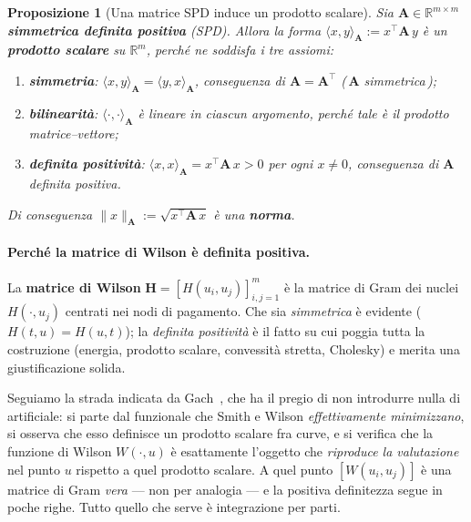 \documentclass[11pt,a4paper]{article}
\theoremstyle{plain}
\newtheorem{proposizione}[teorema]{Proposizione}
\theoremstyle{definition}
\theoremstyle{remark}
\newcommand{\Hmat}{\mathbf{H}}
\newcommand{\transp}{^{\!\top}}
\begin{document}
\begin{proposizione}[Una matrice SPD induce un prodotto scalare]
\label{oss:spd-prodotto}
Sia $\mathbf{A}\in\mathbb{R}^{m\times m}$ \textbf{simmetrica definita positiva} (SPD).
Allora la forma $\langle x,y\rangle_{\mathbf{A}} := x\transp \mathbf{A}\, y$ \`e un
\textbf{prodotto scalare} su $\mathbb{R}^m$, perch\'e ne soddisfa i tre assiomi:
\begin{enumerate}
  \item \textbf{simmetria}: $\langle x,y\rangle_{\mathbf{A}} = \langle y,x\rangle_{\mathbf{A}}$,
        conseguenza di $\mathbf{A} = \mathbf{A}\transp$ (\,$\mathbf{A}$ \emph{simmetrica}\,);
  \item \textbf{bilinearit\`a}: $\langle \cdot,\cdot\rangle_{\mathbf{A}}$ \`e lineare in
        ciascun argomento, perch\'e tale \`e il prodotto matrice--vettore;
  \item \textbf{definita positivit\`a}: $\langle x,x\rangle_{\mathbf{A}} = x\transp\mathbf{A}\,x > 0$
        per ogni $x\neq 0$, conseguenza di $\mathbf{A}$ \emph{definita positiva}.
\end{enumerate}
Di conseguenza $\|x\|_{\mathbf{A}} := \sqrt{x\transp \mathbf{A}\, x}$ \`e una \textbf{norma}.
\end{proposizione}

\paragraph{Perch\'e la matrice di Wilson \`e definita positiva.}
La \textbf{matrice di Wilson} $\Hmat = [H(u_i,u_j)]_{i,j=1}^{m}$ \`e la matrice di Gram dei
nuclei $H(\cdot,u_j)$ centrati nei nodi di pagamento. Che sia \emph{simmetrica} \`e evidente
($H(t,u)=H(u,t)$); la \emph{definita positivit\`a} \`e il fatto su cui poggia tutta la
costruzione (energia, prodotto scalare, convessit\`a stretta, Cholesky) e merita una
giustificazione solida.

Seguiamo la strada indicata da Gach~\cite{gach2017}, che ha il pregio di non introdurre nulla
di artificiale: si parte dal funzionale che Smith e Wilson \emph{effettivamente minimizzano},
si osserva che esso definisce un prodotto scalare fra curve, e si verifica che la funzione di
Wilson $W(\cdot,u)$ \`e esattamente l'oggetto che \emph{riproduce la valutazione} nel punto
$u$ rispetto a quel prodotto scalare. A quel punto $[W(u_i,u_j)]$ \`e una matrice di Gram
\emph{vera} --- non per analogia --- e la positiva definitezza segue in poche righe. Tutto
quello che serve \`e integrazione per parti.
\end{document}
